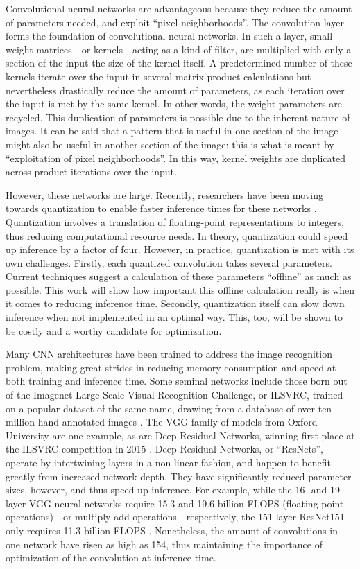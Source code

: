 Convolutional neural networks are advantageous because they reduce the amount of parameters needed, and exploit ``pixel neighborhoods''. The convolution layer forms the foundation of convolutional neural networks. In such a layer, small weight matrices---or kernels---acting as a kind of filter, are multiplied with only a section of the input the size of the kernel itself. A predetermined number of these kernels iterate over the input in several matrix product calculations but nevertheless drastically reduce the amount of parameters, as each iteration over the input is met by the same kernel. In other words, the weight parameters are recycled. This duplication of parameters is possible due to the inherent nature of images. It can be said that a pattern that is useful in one section of the image might also be useful in another section of the image: this is what is meant by ``exploitation of pixel neighborhoods''. In this way, kernel weights are duplicated across product iterations over the input.

However, these networks are large. Recently, researchers have been moving towards quantization to enable faster inference times for these networks \cite{warden_quantize}. Quantization involves a translation of floating-point representations to integers, thus reducing computational resource needs. In theory, quantization could speed up inference by a factor of four. However, in practice, quantization is met with its own challenges. Firstly, each quantized convolution takes several parameters. Current techniques suggest a calculation of these parameters ``offline'' as much as possible. This work will show how important this offline calculation really is when it comes to reducing inference time. Secondly, quantization itself can slow down inference when not implemented in an optimal way. This, too, will be shown to be costly and a worthy candidate for optimization.

Many CNN architectures have been trained to address the image recognition problem, making great strides in reducing memory consumption and speed at both training and inference time. Some seminal networks include those born out of the Imagenet Large Scale Visual Recognition Challenge, or ILSVRC, trained on a popular dataset of the same name, drawing from a database of over ten million hand-annotated images \cite{imagenet}. The VGG family of models from Oxford University \cite{return} are one example, as are Deep Residual Networks, winning first-place at the ILSVRC competition in 2015 \cite{resnets2}. Deep Residual Networks, or ``ResNets'', operate by intertwining layers in a non-linear fashion, and happen to benefit greatly from increased network depth. They have significantly reduced parameter sizes, however, and thus speed up inference. For example, while the 16- and 19-layer VGG neural networks require 15.3 and 19.6 billion FLOPS (floating-point operations)---or multiply-add operations---respectively, the 151 layer ResNet151 only requires 11.3 billion FLOPS \cite{resnets2}. Nonetheless, the amount of convolutions in one network have risen as high as 154, thus maintaining the importance of optimization of the convolution at inference time. 

